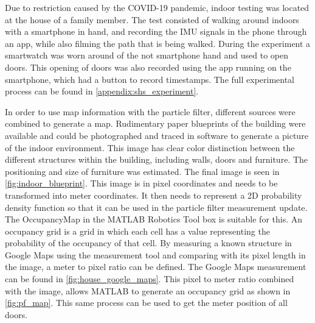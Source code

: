 Due to restriction caused by the COVID-19 pandemic, indoor testing was located at the house of a family member. The test consisted of walking around indoors with a smartphone in hand, and recording the IMU signals in the phone through an app, while also filming the path that is being walked. During the experiment a smartwatch was worn around of the not smartphone hand and used to open doors. This opening of doors was also recorded using the app running on the smartphone, which had a button to record timestamps. The full experimental process can be found in \cref{appendix:shs_experiment}. \par 
In order to use map information with the particle filter, different sources were combined to generate a map. Rudimentary paper blueprints of the building were available and could be photographed and traced in software to generate a picture of the indoor environment. This image has clear color distinction between the different structures within the building, including walls, doors and furniture. The positioning and size of furniture was estimated. The final image is seen in \cref{fig:indoor_blueprint}. This image is in pixel coordinates and needs to be transformed into meter coordinates. It then needs to represent a 2D probability density function so that it can be used in the particle filter measurement update. \\
The OccupancyMap in the MATLAB Robotics Tool box is suitable for this. An occupancy grid is a grid in which each cell has a value representing the probability of the occupancy of that cell. By measuring a known structure in Google Maps using the measurement tool and comparing with its pixel length in the image, a meter to pixel ratio can be defined. The Google Maps measurement can be found in \cref{fig:house_google_maps}. This pixel to meter ratio combined with the image, allows MATLAB to generate an occupancy grid as shown in \cref{fig:pf_map}. This same process can be used to get the meter position of all doors.

